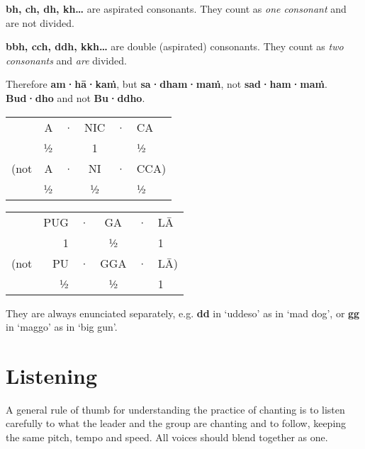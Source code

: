 \textbf{bh, ch, dh, kh\ldots} are aspirated consonants. They count as
\textit{one consonant} and are not divided.

\textbf{bbh, cch, ddh, kkh\ldots} are double (aspirated) consonants. They count as
\textit{two consonants} and \textit{are} divided.

Therefore \textbf{am·hā·kaṁ}, but \textbf{sa·dham·maṁ}, not \textbf{sad·ham·maṁ}.
\textbf{Bud·dho} and not \textbf{Bu·ddho}.

\begin{centering}

\begin{minipage}{0.8\linewidth}
\begin{multicols}{2}
\setlength{\tabcolsep}{1.8pt}%

\begin{tabular}{rrcccl}
     & A & · & NIC & · & CA   \\
     & ½ &   &  1  &   & ½    \\
(not & A & · & NI  & · & CCA) \\
     & ½ &   & ½   &   & ½    \\
\end{tabular}

\columnbreak

\begin{tabular}{rrcccl}
     & PUG & · & GA  & · & LĀ \\
     &  1  &   &  ½  &   &  1 \\
(not & PU  & · & GGA & · & LĀ)\\
     &  ½  &   &  ½  &   &  1 \\
\end{tabular}

\end{multicols}
\end{minipage}

\end{centering}

They are always enunciated separately, e.g. \textbf{dd} in ‘uddeso’ as
in ‘mad dog’, or \textbf{gg} in ‘maggo’ as in ‘big gun’.

\section{Listening}

A general rule of thumb for understanding the practice of chanting is to
listen carefully to what the leader and the group are chanting and to
follow, keeping the same pitch, tempo and speed. All voices should blend
together as one.

